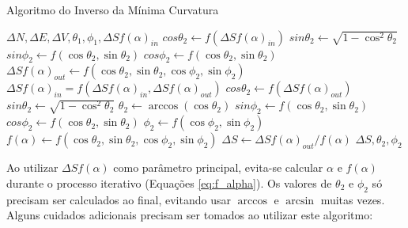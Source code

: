 \documentclass[final,5p]{elsarticle}
\numberwithin{equation}{section}
\begin{document}
\begin{algorithm}
    \caption{Algoritmo do Inverso da Mínima Curvatura}\label{alg:mcm}
    \begin{algorithmic}
        \Require $\Delta N, \Delta E, \Delta V, \theta_1, \phi_1, \Delta S f(\alpha)_{in}$
        \Repeat
            \State $cos \theta_2 \gets f(\Delta S f(\alpha)_{in})$ \Comment{\ref{eq:cos_theta2}}
            \State $sin \theta_2 \gets \sqrt{1 - \cos^2 \theta_2}$
            \State $sin \phi_2 \gets f(\cos \theta_2, \sin \theta_2)$ \Comment{\ref{eq:sin_phi2}}
            \State $cos \phi_2 \gets f(\cos \theta_2, \sin \theta_2)$ \Comment{\ref{eq:cos_phi2}}
            \State $\Delta S f(\alpha)_{out} \gets f(\cos \theta_2, \sin \theta_2, \cos \phi_2, \sin \phi_2)$ \Comment{\ref{eq:DeltaSfa}}
                \State $\Delta S f(\alpha)_{in} = f(\Delta S f(\alpha)_{in}, \Delta S f(\alpha)_{out})$
            \EndIf
        \State $cos \theta_2 \gets f(\Delta S f(\alpha)_{out})$ \Comment{\ref{eq:cos_theta2}}
        \State $sin \theta_2 \gets \sqrt{1 - \cos^2 \theta_2}$
        \State $\theta_2 \gets \arccos{(\cos {\theta_2})}$\Comment{$0 \leq \theta_2 \le \pi$}
        \State $sin \phi_2 \gets f(\cos \theta_2, \sin \theta_2)$ \Comment{\ref{eq:sin_phi2}}
        \State $cos \phi_2 \gets f(\cos \theta_2, \sin \theta_2)$ \Comment{\ref{eq:cos_phi2}}
        \State $\phi_2 \gets f(\cos \phi_2, \sin \phi_2)$ 
        \State $f(\alpha) \gets f(\cos \theta_2, \sin \theta_2, \cos \phi_2, \sin \phi_2)$ \Comment{\ref{eq:falfa}}
        \State $\Delta S \gets \Delta S f(\alpha)_{out} / f(\alpha)$
        \State \Return $\Delta S, \theta_2, \phi_2$
    \end{algorithmic}
\end{algorithm}

Ao utilizar $\Delta S f(\alpha)$ como parâmetro principal, evita-se calcular $\alpha$ e $f(\alpha)$ durante o processo iterativo (Equações \ref{eq:f_alpha}). Os valores de $\theta_2$ e $\phi_2$ só precisam ser calculados ao final, evitando usar $\arccos$ e $\arcsin$ muitas vezes. Alguns cuidados adicionais precisam ser tomados ao utilizar este algoritmo:
\end{document}
